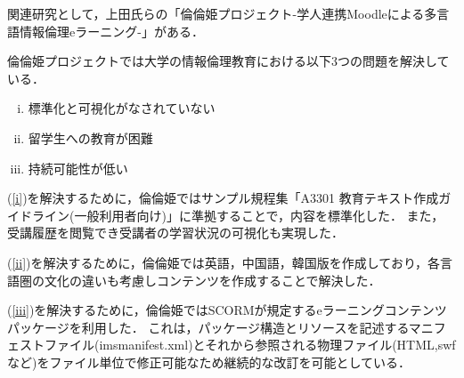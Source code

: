 関連研究として，上田氏らの「倫倫姫プロジェクト-学人連携Moodleによる多言語情報倫理eラーニング-」\cite{rinri}がある．

倫倫姫プロジェクトでは大学の情報倫理教育における以下3つの問題を解決している．

\begin{enumerate}[(i)]
    \item 標準化と可視化がなされていない \label{i}
    \item 留学生への教育が困難 \label{ii}
    \item 持続可能性が低い \label{iii}
\end{enumerate}

(\ref{i})を解決するために，倫倫姫ではサンプル規程集「A3301 教育テキスト作成ガイドライン(一般利用者向け)」に準拠することで，内容を標準化した．
また，受講履歴を閲覧でき受講者の学習状況の可視化も実現した．

(\ref{ii})を解決するために，倫倫姫では英語，中国語，韓国版を作成しており，各言語圏の文化の違いも考慮しコンテンツを作成することで解決した．

(\ref{iii})を解決するために，倫倫姫ではSCORMが規定するeラーニングコンテンツパッケージを利用した．
これは，パッケージ構造とリソースを記述するマニフェストファイル(imsmanifest.xml)とそれから参照される物理ファイル(HTML,swfなど)をファイル単位で修正可能なため継続的な改訂を可能としている．
